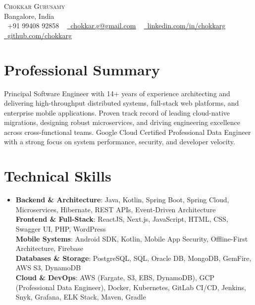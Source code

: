 \documentclass[letterpaper,11pt]{article}
\begin{document}
\begin{center}
    {\Huge \scshape Chokkar Gurusamy} \\ \vspace{1pt}
    Bangalore, India \\ \vspace{1pt}
    \small \raisebox{-0.1\height}\faPhone\ +91 99408 92858 ~ 
    \href{mailto:chokkar.g@gmail.com}{\raisebox{-0.2\height}\faEnvelope\ \underline{chokkar.g@gmail.com}} ~ 
    \href{https://linkedin.com/in/chokkarg}{\raisebox{-0.2\height}\faLinkedin\ \underline{linkedin.com/in/chokkarg}} ~
    \href{https://github.com/chokkarg}{\raisebox{-0.2\height}\faGithub\ \underline{github.com/chokkarg}}
    \vspace{-8pt}
\end{center}

\section{Professional Summary}
{\small Principal Software Engineer with 14+ years of experience architecting and delivering high-throughput distributed systems, full-stack web platforms, and enterprise mobile applications. Proven track record of leading cloud-native migrations, designing robust microservices, and driving engineering excellence across cross-functional teams. Google Cloud Certified Professional Data Engineer with a strong focus on system performance, security, and developer velocity.}
\vspace{-10pt}

\section{Technical Skills}
 \begin{itemize}[leftmargin=0.15in, label={}]
    \item{\small
     \textbf{Backend \& Architecture}{: Java, Kotlin, Spring Boot, Spring Cloud, Microservices, Hibernate, REST APIs, Event-Driven Architecture} \\
     \textbf{Frontend \& Full-Stack}{: ReactJS, Next.js, JavaScript, HTML, CSS, Swagger UI, PHP, WordPress} \\
     \textbf{Mobile Systems}{: Android SDK, Kotlin, Mobile App Security, Offline-First Architecture, Firebase} \\
     \textbf{Databases \& Storage}{: PostgreSQL, SQL, Oracle DB, MongoDB, GemFire, AWS S3, DynamoDB} \\
     \textbf{Cloud \& DevOps}{: AWS (Fargate, S3, EBS, DynamoDB), GCP (Professional Data Engineer), Docker, Kubernetes, GitLab CI/CD, Jenkins, Snyk, Grafana, ELK Stack, Maven, Gradle}
   }
 \end{itemize}
\vspace{-16pt}
\end{document}
